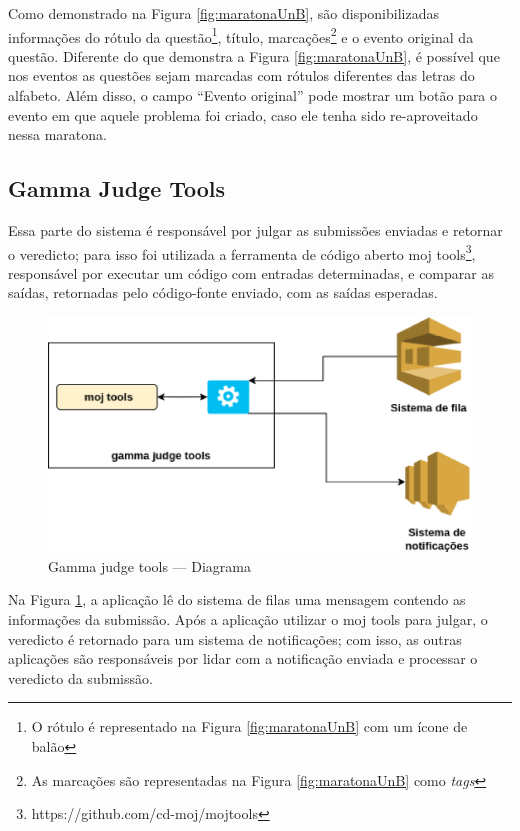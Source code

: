 Como demonstrado na Figura \ref{fig:maratonaUnB}, são disponibilizadas informações do rótulo da questão\footnote{O rótulo é representado na Figura \ref{fig:maratonaUnB} com um ícone de balão}, título, marcações\footnote{As marcações são representadas na Figura \ref{fig:maratonaUnB} como \textit{tags}} e o evento original da questão. Diferente do que demonstra a Figura \ref{fig:maratonaUnB}, é possível que nos eventos as questões sejam marcadas com rótulos diferentes das letras do alfabeto. Além disso, o campo ``Evento original'' pode mostrar um botão para o evento em que aquele problema foi criado, caso ele tenha sido re-aproveitado nessa maratona.

\subsection{Gamma Judge Tools}
\label{sec:gamaJudgeTools}

Essa parte do sistema é responsável por julgar as submissões enviadas e retornar o veredicto; para isso foi utilizada a ferramenta de código aberto moj tools\footnote{https://github.com/cd-moj/mojtools}, responsável por executar um código com entradas determinadas, e comparar as saídas, retornadas pelo código-fonte enviado, com as saídas esperadas.

\begin{figure}[H]
    \centering
    \includegraphics[keepaspectratio=true,scale=0.5]{figuras/gamma_judge_tools_diagram.eps}
    \caption{Gamma judge tools — Diagrama}
    \label{fig:judge_tools_diagram}
\end{figure}

Na Figura \ref{fig:judge_tools_diagram}, a aplicação lê do sistema de filas uma mensagem contendo as informações da submissão. Após a aplicação utilizar o moj tools para julgar, o veredicto é retornado para um sistema de notificações; com isso, as outras aplicações são responsáveis por lidar com a notificação enviada e processar o veredicto da submissão. 


